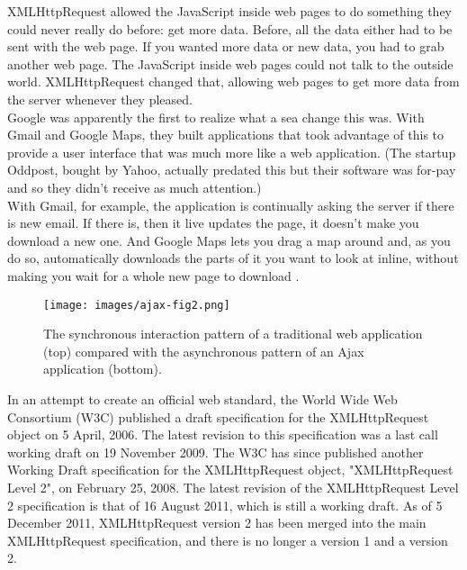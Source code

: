 XMLHttpRequest allowed the JavaScript inside web pages to do something they could never really do before: get more data. Before, all the data either had to be sent with the web page. If you wanted more data or new data, you had to grab another web page. The JavaScript inside web pages could not talk to the outside world. XMLHttpRequest changed that, allowing web pages to get more data from the server whenever they pleased.\\

Google was apparently the first to realize what a sea change this was. With Gmail and Google Maps, they built applications that took advantage of this to provide a user interface that was much more like a web application. (The startup Oddpost, bought by Yahoo, actually predated this but their software was for-pay and so they didn’t receive as much attention.)\\

With Gmail, for example, the application is continually asking the server if there is new email. If there is, then it live updates the page, it doesn’t make you download a new one. And Google Maps lets you drag a map around and, as you do so, automatically downloads the parts of it you want to look at inline, without making you wait for a whole new page to download \cite{swartz2005brief}.\\

\begin{figure}[h]
	\centering
	\texttt{[image: images/ajax-fig2.png]}
	\caption{The synchronous interaction pattern of a traditional web application (top) compared with the asynchronous pattern of an Ajax application (bottom).}
\end{figure}

In an attempt to create an official web standard, the World Wide Web Consortium (W3C) published a draft specification for the XMLHttpRequest object on 5 April, 2006. The latest revision to this specification was a last call working draft on 19 November 2009. The W3C has since published another Working Draft specification for the XMLHttpRequest object, "XMLHttpRequest Level 2", on February 25, 2008. The latest revision of the XMLHttpRequest Level 2 specification is that of 16 August 2011, which is still a working draft. As of 5 December 2011, XMLHttpRequest version 2 has been merged into the main XMLHttpRequest specification, and there is no longer a version 1 and a version 2.
		
